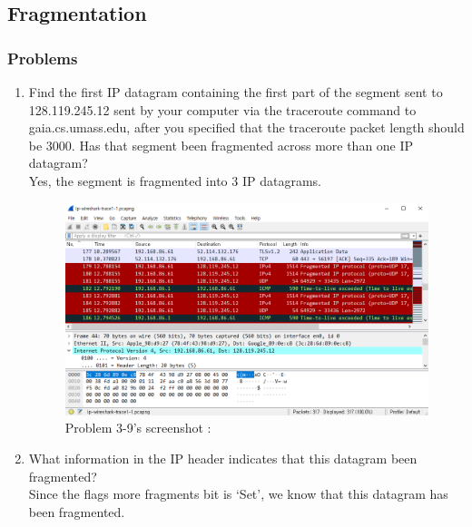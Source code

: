 \subsection{Fragmentation}
    \subsubsection*{Problems}
    \begin{enumerate}[label=\bfseries Problem \arabic*:,leftmargin=*,labelindent=1em]
    \addtocounter{enumi}{8}
        \item Find the first IP datagram containing the first part of the segment sent to 128.119.245.12 sent by your computer via the traceroute command to gaia.cs.umass.edu, after you specified that the traceroute packet length should be 3000. Has that segment been fragmented across more than one IP datagram?\\[0.2mm]
        \soln Yes, the segment is fragmented into 3 IP datagrams.
        \begin{figure}[!h]\centering
        \hspace{15mm}  
    		\includegraphics[width=.85\textwidth]{image/week02/3-9-1.png}
    		\caption{\footnotesize Problem 3-9's screenshot : }
    		\vspace{-10pt}
        \end{figure}
        \item What information in the IP header indicates that this datagram been fragmented? \\[0.2mm]
        \soln Since the flags more fragments bit is ‘Set’, we know that this datagram has been fragmented.

\end{enumerate}

